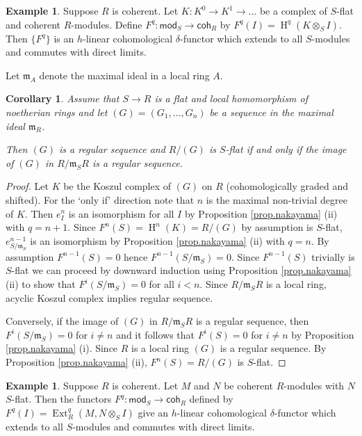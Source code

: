 \documentclass[a4paper,10pt]{amsart}
\theoremstyle{plain}
\newtheorem{cor}[xx]{Corollary}%
\theoremstyle{definition}
\newtheorem{ex}[xx]{Example}%
\theoremstyle{remark}
\numberwithin{equation}{xx}
\DeclareMathOperator{\Ext}{Ext}
\DeclareMathOperator{\cH}{H}
\newcommand{\co}{\colon}
\newcommand{\ra}{\rightarrow}
\newcommand{\ot}{{\otimes}}
\newcommand{\cat}[1]{\mathsf{{#1}}}
\newcommand{\fr}[1]{\mathfrak{{#1}}}
\newcommand{\xt}[4]{{\Ext} _{#2}^{#1}({#3},{#4})}
\begin{document}
\begin{ex}\label{ex.nakcplx}
Suppose \(R\) is coherent.
Let \(K\co K^{0}\ra K^{1}\ra\dots\) be a complex of \(S\)-flat and coherent \(R\)-modules. Define \(F^{q}\co \cat{mod}_{S}\ra\cat{coh}_{R}\) by \(F^{q}(I)=\cH^{q}(K\ot_{S}I)\). Then \(\{F^{q}\}\) is an \(h\)-linear cohomological \(\delta\)-functor which extends to all \(S\)-modules and commutes with direct limits.
\end{ex}
Let \(\fr{m}_{A}\) denote the maximal ideal in a local ring \(A\).
\begin{cor}\label{cor.nak}
Assume that \(S\ra R\) is a flat and local homomorphism of noetherian rings and let \((G)=(G_{1},\dots,G_{n})\) be a sequence in the maximal ideal \(\fr{m}_{R}\)\textup{.} 

Then \((G)\) is a regular sequence and \(R/(G)\) is \(S\)-flat if and only if the image of \((G)\) in \(R/\fr{m}_{S}R\) is a regular sequence\textup{.}
\end{cor}
\begin{proof}
Let \(K\) be the Koszul complex of \((G)\) on \(R\) \textup{(}cohomologically graded and shifted\textup{).}
For the `only if' direction note that \(n\) is the maximal non-trivial degree of \(K\). Then \(e^{n}_{I}\) is an isomorphism for all \(I\) by Proposition \ref{prop.nakayama} (ii) with \(q=n+1\). Since \(F^{n}(S)=\cH^{n}(K)=R/(G)\) by assumption is \(S\)-flat, \(e^{n-1}_{S/\fr{m}_{S}}\) is an isomorphism by Proposition \ref{prop.nakayama} (ii) with \(q=n\). By assumption \(F^{n-1}(S)=0\) hence \(F^{n-1}(S/\fr{m}_{S})=0\). Since \(F^{n-1}(S)\) trivially is \(S\)-flat we can proceed by downward induction using Proposition \ref{prop.nakayama} (ii) to show that \(F^{i}(S/\fr{m}_{S})=0\) for all \(i<n\). Since \(R/\fr{m}_{S}R\) is a local ring, acyclic Koszul complex implies regular sequence.

Conversely, if the image of \((G)\) in \(R/\fr{m}_{S}R\) is a regular sequence, then \(F^{i}(S/\fr{m}_{S})=0\) for \(i\neq n\) and it follows that \(F^{i}(S)=0\) for \(i\neq n\) by Proposition \ref{prop.nakayama} (i). Since \(R\) is a local ring \((G)\) is a regular sequence. By Proposition \ref{prop.nakayama} (ii), \(F^{n}(S)=R/(G)\) is \(S\)-flat.
\end{proof}
\begin{ex}\label{ex.nakayama}
Suppose \(R\) is coherent. Let \(M\) and \(N\) be coherent \(R\)-modules with \(N\) \(S\)-flat. Then the functors \(F^{q}\co \cat{mod}_{S}\ra\cat{coh}_{R}\) defined by \(F^{q}(I)=\xt{q}{R}{M}{N\ot_{S}I}\) give an \(h\)-linear cohomological \(\delta\)-functor which extends to all \(S\)-modules and commutes with direct limits.
\end{ex}
\end{document}

